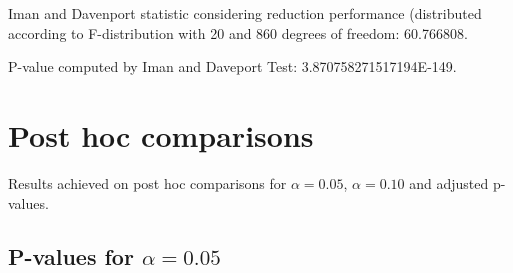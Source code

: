 \documentclass[a4paper,10pt]{article}
\begin{document}
\begin{landscape}
Iman and Davenport statistic considering reduction performance (distributed according to F-distribution with 20 and 860 degrees of freedom: 60.766808.

P-value computed by Iman and Daveport Test: 3.870758271517194E-149.\newline



\pagebreak

\section{Post hoc comparisons}

Results achieved on post hoc comparisons for $\alpha = 0.05$, $\alpha = 0.10$ and adjusted p-values.

\subsection{P-values for $\alpha=0.05$}


\end{landscape}
\end{document}

